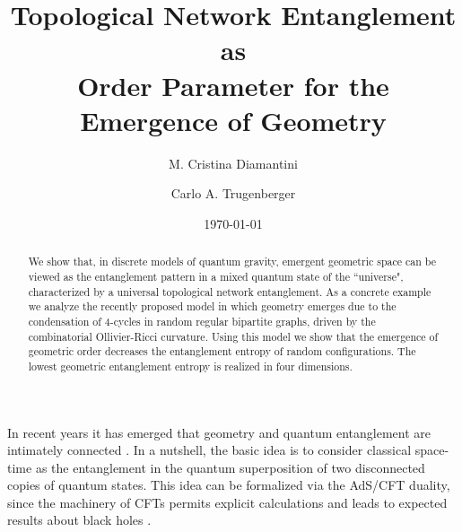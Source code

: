 \documentclass[twocolumn,
preprintnumbers,amsmath,amssymb]{revtex4}
\begin{document}

\title{Topological Network Entanglement as \\
Order Parameter for the Emergence of Geometry}%

\author{M. Cristina Diamantini}
%



\author{Carlo A. Trugenberger}
%


\date{\today}%




\begin{abstract}
We show that, in discrete models of quantum gravity, emergent geometric space can be viewed as the entanglement pattern in a mixed quantum state of the ``universe", characterized by a universal topological network entanglement. As a concrete example we analyze the recently proposed model in which geometry emerges due to the condensation of 4-cycles in random regular bipartite graphs, driven by the combinatorial Ollivier-Ricci curvature. Using this model we show that the emergence of geometric order decreases the entanglement entropy of random configurations. The lowest geometric entanglement entropy is realized in four dimensions. 


\end{abstract}
\maketitle

In recent years it has emerged that geometry and quantum entanglement are intimately connected \cite{rams1, rams2, rams3}. In a nutshell, the basic idea is to consider classical space-time as the entanglement in the quantum superposition of two disconnected copies of quantum states. This idea can be formalized via the AdS/CFT duality, since the machinery of CFTs permits explicit calculations and leads to expected results about black holes \cite{mald}. 
\end{document}
